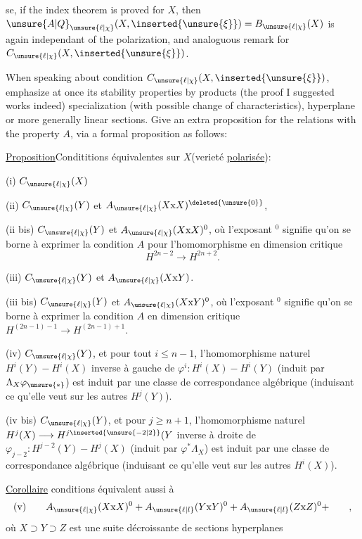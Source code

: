 se, if the index theorem is proved for $X$, then $\unsure{A|Q}_{\unsure{\ell|\chi}}(X,\inserted{\unsure{\xi}})=B_{\unsure{\ell|\chi}}(X)$ is again independant of the polarization, and analoguous remark for $C_{\unsure{\ell|\chi}}(X,\inserted{\unsure{\xi}})$.

When speaking about condition $C_{\unsure{\ell|\chi}}(X,\inserted{\unsure{\xi}})$, emphasize at once its stability properties by products (the proof I suggested works indeed) specialization (with possible change of characteristics), hyperplane or more generally linear sections. Give an extra proposition for the relations with the property $A$, via a formal proposition as follows:

\uline{Proposition}\quad Condititions équivalentes sur $X$(verieté \uline{polarisée}):

(i) $C_{\unsure{\ell|\chi}}(X)$

(ii) $C_{\unsure{\ell|\chi}}(Y)$ et $A_{\unsure{\ell|\chi}}(X\mathrm{x}X)^{\deleted{\unsure{0}}}$, 

(ii bis) $C_{\unsure{\ell|\chi}}(Y)$ et $A_{\unsure{\ell|\chi}}(X\mathrm{x}X)^0$, où l'exposant $^0$ signifie qu'on se borne à exprimer la condition $A$ pour l'homomorphisme en dimension critique
\[
H^{2n-2}\longrightarrow H^{2n+2}.
\]

(iii) $C_{\unsure{\ell|\chi}}(Y)$ et $A_{\unsure{\ell|\chi}}(X\mathrm{x}Y)$.

(iii bis) $C_{\unsure{\ell|\chi}}(Y)$ et $A_{\unsure{\ell|\chi}}(X\mathrm{x}Y)^0$, où l'exposant $^0$ signifie qu'on se borne à exprimer la condition $A$ en dimension critique $H^{(2n-1)-1}\longrightarrow H^{(2n-1)+1}$.

(iv)  $C_{\unsure{\ell|\chi}}(Y)$, et pour tout $i\leq n-1$, l'homomorphisme naturel $H^i(Y)\mathbin{-}H^i(X)$ inverse à gauche de $\varphi^i:H^i(X)\mathbin{-}H^i(Y)$ (induit par $\Lambda_X\varphi_{\unsure{*}}$) est induit par une classe de correspondance algébrique (induisant ce qu'elle veut sur les autres $H^j(Y)$).

(iv bis) $C_{\unsure{\ell|\chi}}(Y)$, et pour $j\geq n+1$, l'homomorphisme naturel $H^j(X)\longrightarrow H^{j\inserted{\unsure{-2|2}}}(Y$ inverse à droite de $\varphi_{j-2}:H^{j-2}(Y)\mathbin{-}H^j(X)$  (induit par $\varphi^*\Lambda_X$) est induit par une classe de correspondance algébrique (induisant ce qu'elle veut sur les autres $H^i(X)$).

\uline{Corollaire}\quad {} conditions équivalent aussi à
\[
\text{(v)}\qquad A_{\unsure{\ell|\chi}}(X\mathrm{x}X)^0+A_{\unsure{\ell|l}}(Y\mathrm{x}Y)^0+A_{\unsure{\ell|l}}(Z\mathrm{x}Z)^0+\qquad,
\]
où $X\supset Y\supset Z$ est une suite décroissante de sections hyperplanes

